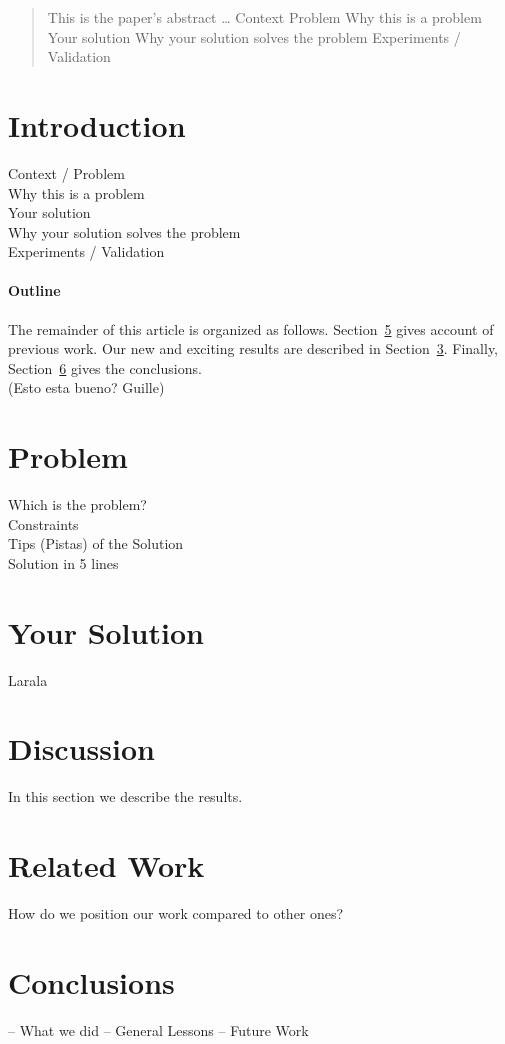 \documentclass[11pt, twocolumn]{article}
\begin{document}
\maketitle

\begin{abstract}
This is the paper's abstract \ldots
Context Problem
Why this is a problem
Your solution
Why your solution solves the problem
Experiments / Validation
\end{abstract}

\section{Introduction}
Context / Problem\\
Why this is a problem\\
Your solution\\
Why your solution solves the problem\\
Experiments / Validation\\

\paragraph{Outline}
The remainder of this article is organized as follows.\cite{Gil:02}
Section~\ref{related work} gives account of previous work.
Our new and exciting results are described in Section~\ref{your solution}.
Finally, Section~\ref{conclusions} gives the conclusions.\\
 (Esto esta bueno? Guille)

\section{Problem}\label{problem}
Which is the problem?\\
Constraints\\
Tips (Pistas) of the Solution\\
Solution in 5 lines\\

\section{Your Solution}\label{your solution}
Larala

\section{Discussion}\label{Discussion}
In this section we describe the results.

\section{Related Work}\label{related work}
How do we position our work compared to other ones?

\section{Conclusions}\label{conclusions}
– What we did
– General Lessons
– Future Work



\end{document}
